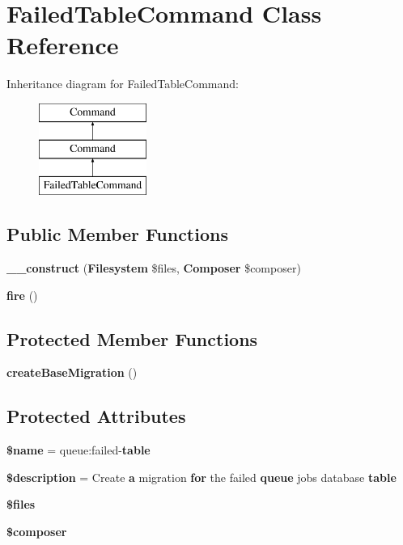 \section{Failed\+Table\+Command Class Reference}
\label{class_illuminate_1_1_queue_1_1_console_1_1_failed_table_command}
Inheritance diagram for Failed\+Table\+Command\+:\begin{figure}[H]
\begin{center}
\leavevmode
\includegraphics[height=3.000000cm]{class_illuminate_1_1_queue_1_1_console_1_1_failed_table_command}
\end{center}
\end{figure}
\subsection*{Public Member Functions}
\begin{DoxyCompactItemize}
\item 
{\bf \+\_\+\+\_\+construct} ({\bf Filesystem} \$files, {\bf Composer} \$composer)
\item 
{\bf fire} ()
\end{DoxyCompactItemize}
\subsection*{Protected Member Functions}
\begin{DoxyCompactItemize}
\item 
{\bf create\+Base\+Migration} ()
\end{DoxyCompactItemize}
\subsection*{Protected Attributes}
\begin{DoxyCompactItemize}
\item 
{\bf \$name} = \textquotesingle{}queue\+:failed-\/{\bf table}\textquotesingle{}
\item 
{\bf \$description} = \textquotesingle{}Create {\bf a} migration {\bf for} the failed {\bf queue} jobs database {\bf table}\textquotesingle{}
\item 
{\bf \$files}
\item 
{\bf \$composer}
\end{DoxyCompactItemize}


